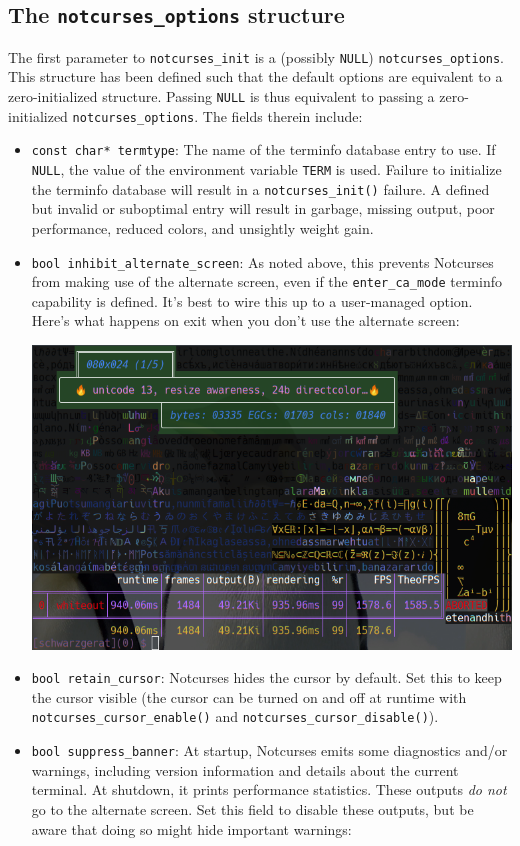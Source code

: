\documentclass[letterpaper,10pt]{article}
\newenvironment{denseitemize}{
  \begin{itemize}
      \setlength{\itemsep}{0pt}
}{
  \end{itemize}
}
\begin{document}
\subsection{The \texttt{notcurses\_options} structure}
The first parameter to \texttt{notcurses\_init} is a (possibly \texttt{NULL})
\texttt{notcurses\_options}. This structure has been defined such that the
default options are equivalent to a zero-initialized structure. Passing \texttt{NULL}
is thus equivalent to passing a zero-initialized \texttt{notcurses\_options}.
The fields therein include:
\begin{denseitemize}
\item{\texttt{const char* termtype}: The name of the terminfo database entry to
    use. If \texttt{NULL}, the value of the environment variable \texttt{TERM}
    is used. Failure to initialize the terminfo database will result in a
    \texttt{notcurses\_init()} failure.} A defined but invalid or suboptimal
    entry will result in garbage, missing output, poor performance, reduced
    colors, and unsightly weight gain.
\item{\texttt{bool inhibit\_alternate\_screen}: As noted above, this prevents
    Notcurses from making use of the alternate screen, even if the \texttt{enter\_ca\_mode}
    terminfo capability is defined. It's best to wire this up to a user-managed
    option. Here's what happens on exit when you don't use the alternate
    screen:

    \begin{center}
      \includegraphics[width=.7\linewidth]{media/no-alternate-screen.png}
    \end{center}
  }
\item{\texttt{bool retain\_cursor}: Notcurses hides the cursor by default.
    Set this to keep the cursor visible (the cursor can be turned on and off
    at runtime with \texttt{notcurses\_cursor\_enable()} and
    \texttt{notcurses\_cursor\_disable()}).}
\item{\texttt{bool suppress\_banner}: At startup, Notcurses emits some
    diagnostics and/or warnings, including version information and details
    about the current terminal. At shutdown, it prints performance statistics.
    These outputs \textit{do not} go to the alternate screen. Set this
    field to disable these outputs, but be aware that doing so might hide
    important warnings:

}
\end{denseitemize}
\end{document}
